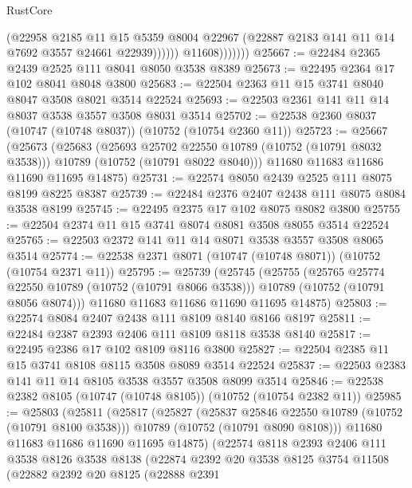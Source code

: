 \begin{lexlean}{RustCore}
\begin{coremodule}
                          (@22958
                            @2185
                            @11
                            @15
                            @5359
                            @8004
                            @22967
                            (@22887 @2183 @141 @11 @14 @7692 @3557 @24661 @22939))))))
                  @11608)))))))
@25667 := @22484 @2365 @2439 @2525 @111 @8041 @8050 @3538 @8389
@25673 := @22495 @2364 @17 @102 @8041 @8048 @3800
@25683 := @22504 @2363 @11 @15 @3741 @8040 @8047 @3508 @8021 @3514 @22524
@25693 := @22503 @2361 @141 @11 @14 @8037 @3538 @3557 @3508 @8031 @3514
@25702 := @22538 @2360 @8037 (@10747 (@10748 @8037)) (@10752 (@10754 @2360 @11))
@25723 := @25667
    (@25673
      (@25683
        (@25693 @25702 @22550 @10789 (@10752 (@10791 @8032 @3538)))
        @10789
        (@10752 (@10791 @8022 @8040)))
      @11680
      @11683
      @11686
      @11690
      @11695
      @14875)
@25731 := @22574 @8050 @2439 @2525 @111 @8075 @8199 @8225 @8387
@25739 := @22484 @2376 @2407 @2438 @111 @8075 @8084 @3538 @8199
@25745 := @22495 @2375 @17 @102 @8075 @8082 @3800
@25755 := @22504 @2374 @11 @15 @3741 @8074 @8081 @3508 @8055 @3514 @22524
@25765 := @22503 @2372 @141 @11 @14 @8071 @3538 @3557 @3508 @8065 @3514
@25774 := @22538 @2371 @8071 (@10747 (@10748 @8071)) (@10752 (@10754 @2371 @11))
@25795 := @25739
    (@25745
      (@25755
        (@25765 @25774 @22550 @10789 (@10752 (@10791 @8066 @3538)))
        @10789
        (@10752 (@10791 @8056 @8074)))
      @11680
      @11683
      @11686
      @11690
      @11695
      @14875)
@25803 := @22574 @8084 @2407 @2438 @111 @8109 @8140 @8166 @8197
@25811 := @22484 @2387 @2393 @2406 @111 @8109 @8118 @3538 @8140
@25817 := @22495 @2386 @17 @102 @8109 @8116 @3800
@25827 := @22504 @2385 @11 @15 @3741 @8108 @8115 @3508 @8089 @3514 @22524
@25837 := @22503 @2383 @141 @11 @14 @8105 @3538 @3557 @3508 @8099 @3514
@25846 := @22538 @2382 @8105 (@10747 (@10748 @8105)) (@10752 (@10754 @2382 @11))
@25985 := @25803
    (@25811
      (@25817
        (@25827
          (@25837 @25846 @22550 @10789 (@10752 (@10791 @8100 @3538)))
          @10789
          (@10752 (@10791 @8090 @8108)))
        @11680
        @11683
        @11686
        @11690
        @11695
        @14875)
      (@22574
        @8118
        @2393
        @2406
        @111
        @3538
        @8126
        @3538
        @8138
        (@22874
          @2392
          @20
          @3538
          @8125
          @3754
          @11508
          (@22882
            @2392
            @20
            @8125
            (@22888
              @2391

\end{coremodule}
\end{lexlean}
